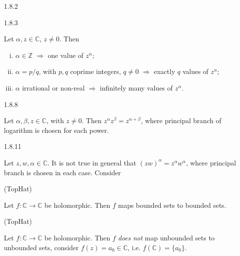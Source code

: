 \documentclass[10pt,landscape]{article}
\begin{document}
\begin{multicols}{3}
\begin{lemma}{1.8.2}{}
\end{lemma}

\begin{theorem}{1.8.3}{}

    Let $\alpha, z \in \mathbb{C}$, $z \neq 0$. Then

        \begin{enumerate}[(i)]
            \setlength{\parskip}{0em}
            \item $\alpha \in \mathbb{Z}$ $\Rightarrow$ one value of $z^{\alpha}$;
            \item $\alpha = p/q$, with $p,q$ coprime integers, $q \neq 0$ $\Rightarrow$ exactly $q$ values of $z^{\alpha}$;
            \item $\alpha$ irrational or non-real $\Rightarrow$ infinitely many values of $z^{\alpha}$.
        \end{enumerate}

\end{theorem}

\begin{lemma}{1.8.8}{}

    Let $\alpha, \beta, z \in \mathbb{C}$, with $z \neq 0$. Then $z^{\alpha}z^{\beta} = z^{\alpha + \beta}$, where principal branch of logarithm is chosen for each power.

\end{lemma}

\begin{exercise}{1.8.11}{}

    Let $z, w, \alpha \in \mathbb{C}$. It is not true in general that $(zw)^{\alpha} = z^{\alpha}w^{\alpha}$, where principal branch is chosen in each case. Consider

\end{exercise}

\begin{remark}{(TopHat)}{}

    Let $f: \mathbb{C} \to \mathbb{C}$ be holomorphic. Then $f$ maps bounded sets to bounded sets.

\end{remark}

\begin{remark}{(TopHat)}{}

    Let $f: \mathbb{C} \to \mathbb{C}$ be holomorphic. Then $f$ \emph{does not} map unbounded sets to unbounded sets, consider $f(z) = a_0 \in \mathbb{C}$, i.e. $f(\mathbb{C}) = \{a_0\}$.


\end{remark}
\end{multicols}
\end{document}

